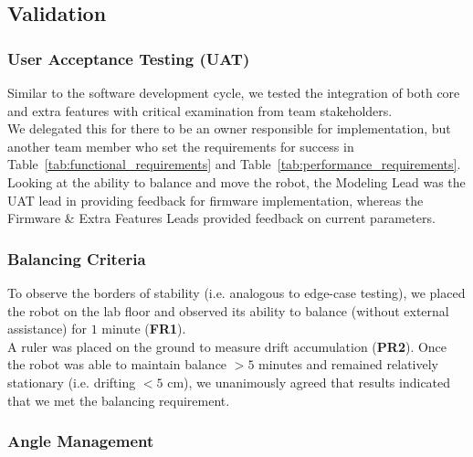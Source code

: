\documentclass{article}
\begin{document}
\subsection{Validation}

\subsubsection{User Acceptance Testing (UAT)}

\begin{minipage}{\linewidth}
    Similar to the software development cycle, we tested the integration of both core and extra features
    with critical examination from team stakeholders. \\

    We delegated this for there to be an owner responsible for implementation, but another team member who set the requirements for success in Table~\ref{tab:functional_requirements} and Table~\ref{tab:performance_requirements}. \\

    Looking at the ability to balance and move the robot, the Modeling Lead was the UAT lead in providing feedback for firmware implementation, whereas the Firmware \& Extra Features Leads provided feedback on current parameters. \\
\end{minipage}

\subsubsection{Balancing Criteria}
\begin{minipage}{\linewidth}
    To observe the borders of stability (i.e. analogous to edge-case testing), we placed the robot on the lab floor and observed its ability to balance (without external assistance) for $1$ minute (\textbf{FR1}). \\

    A ruler was placed on the ground to measure drift accumulation (\textbf{PR2}). Once the robot
    was able to maintain balance $> 5$ minutes and remained relatively
    stationary (i.e. drifting $< 5$ cm), we unanimously agreed that results indicated that we met the balancing
    requirement. \\
\end{minipage}\vspace{0.5mm}

\subsubsection{Angle Management}
\end{document}
